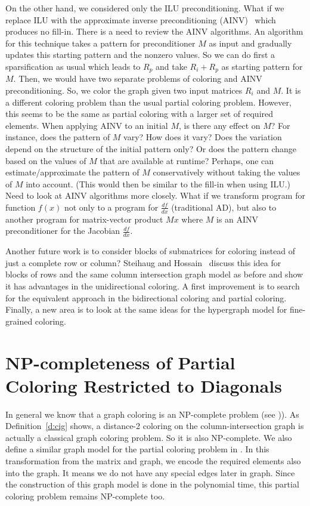 \documentclass[11pt, twoside,a4paper]{book}
\newcommand{\defref}[1]{Definition~\protect\ref{#1}}
\begin{document}
On the other hand, we considered only the ILU preconditioning. What if we replace ILU with the approximate inverse preconditioning (AINV)~\cite{ainv98} which produces no fill-in. There is a need to review the AINV algorithms. An algorithm for this technique takes a pattern for preconditioner $M$ as input and gradually updates this starting pattern and the nonzero values.
So we can do first a sparsification as usual which leads to $R_p$ and take $R_i + R_p$ as starting pattern for $M$. Then, we would have two separate problems of coloring and AINV preconditioning. 
So, we color the graph given two input matrices $R_i$ and $M$.
It is a different coloring problem than the usual partial coloring problem. 
However, this seems to be the same as partial coloring with a larger set of required elements.
When applying AINV to an initial $M$, is there any effect on $M$? For
instance, does the pattern of $M$ vary? How does it vary? Does the
variation depend on the structure of the initial pattern only? Or
does the pattern change based on the values of $M$ that are available
at runtime? Perhaps, one can estimate/approximate the pattern of $M$
conservatively without taking the values of $M$ into account. (This
would then be similar to the fill-in when using ILU.) Need to look
at AINV algorithms more closely.
What if we transform program for function $f(x)$ not only to a program for $\frac{df}{dx}$ (traditional AD), but also to another program for matrix-vector product $Mx$ where $M$ is an AINV preconditioner for the Jacobian $\frac{df}{dx}$.

Another future work is to consider blocks of submatrices for coloring instead of just a complete row or column? Steihaug and Hossain~\cite{Steihaug1997GCa} discuss this idea for blocks of rows and the same column intersection graph model as before and show it has advantages in the unidirectional coloring. A first improvement is to search for the equivalent approach in the bidirectional coloring and partial coloring. Finally, a new area is to look at the same ideas for the hypergraph model for fine-grained coloring.



\appendix
\chapter{NP-completeness of Partial Coloring Restricted to Diagonals}
\label{app.npcomp}
In general we know that a graph coloring is an NP-complete problem 
(see \cite{np-complet-graph-coloring})).
As \defref{d:cig} shows, a distance-2 coloring on the column-intersection graph
is actually a classical graph coloring problem. So it is also NP-complete.
We also define a similar graph model for the partial coloring problem in 
\cite{2016:01}. In this transformation from the matrix and graph, we encode
the required elements also into the graph. It means we do not have any special 
edges later in graph.
Since the construction of this graph model is done in 
the polynomial time, this partial coloring problem remains NP-complete too.
\end{document}

